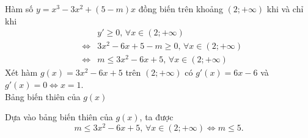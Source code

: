 \begin{vd}
{\begin{enumerate}[\faPencilSquareO]
	Hàm số $y=x^3-3x^2+(5-m)x$ đồng biến trên khoảng $(2;+\infty)$ khi và chỉ khi
	\allowdisplaybreaks
	\begin{eqnarray*}
		&&y'\ge 0,\,\forall x\in (2;+\infty)\\
		&\Leftrightarrow& 3x^2-6x+5-m\ge 0,\,\forall x\in (2;+\infty)\\
		&\Leftrightarrow& m\le 3x^2-6x+5, \,\forall x\in (2;+\infty)
	\end{eqnarray*}
	Xét hàm $g(x)=3x^2-6x+5$ trên $(2;+\infty)$ có $g'(x)=6x-6$ và $g'(x)=0\Leftrightarrow x=1$.\\
	Bảng biến thiên của $g(x)$
	\begin{center}
	\end{center}
	Dựa vào bảng biến thiên của $g(x)$, ta được
	$$m\le 3x^2-6x+5, \,\forall x\in (2;+\infty) \Leftrightarrow m\le 5.$$
\end{enumerate}}
\end{vd}


